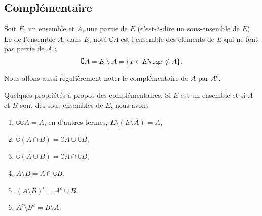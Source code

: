 \subsection{Complémentaire}
\label{AppComplement}

\begin{definition}
    Soit $E$, un ensemble et $A$, une partie de $E$ (c'est-à-dire un sous-ensemble de $E$). Le  de l'ensemble $A$, dans $E$, noté $\complement A$ est l'ensemble des éléments de $E$ qui ne font pas partie de $A$ :
    \begin{equation}
	    \complement A=E\setminus A=\{ x\in E\tq x\notin A \}.
    \end{equation}
\end{definition}

Nous allons aussi régulièrement noter le complémentaire de \( A\) par \( A^c\).

\begin{lemma}		\label{LemPropsComplement}
	Quelques propriétés à propos des complémentaires. Si $E$ est un ensemble et si $A$ et $B$ sont des sous-ensembles de $E$, nous avons
	\begin{enumerate}
		\item
			$\complement \complement A =A $, en d'autres termes, $E\setminus(E\setminus A)=A$,
		\item
			$\complement(A\cap B)=\complement A\cup\complement B$,
		\item
			$\complement(A\cup B)=\complement A\cap\complement B$,
		\item	\label{ItemLemPropComplementiii}
			$A\setminus B=A\cap\complement B$.
        \item       \label{ITEMooNHDUooWtURqQ}
            \( (A\setminus B)^c=A^c\cup B\).
        \item       \label{ITEMooTBWKooTChOmC}
            \( A^c\setminus B^c=B\setminus A\).
	\end{enumerate}
\end{lemma}

